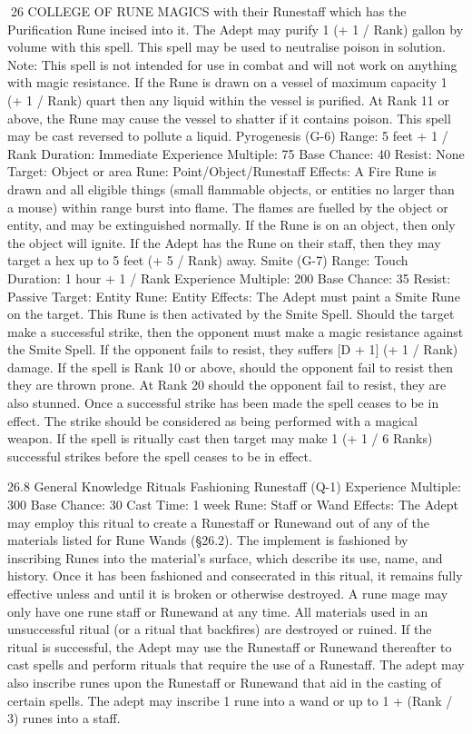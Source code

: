 \documentclass[a4paper]{article}
\begin{document}
\begin{multicols}{3}
26 COLLEGE OF RUNE MAGICS
with their Runestaff which has the Purification
Rune incised into it. The Adept may purify 1 (+ 1 /
Rank) gallon by volume with this spell. This spell
may be used to neutralise poison in solution. Note:
This spell is not intended for use in combat and
will not work on anything with magic resistance. If
the Rune is drawn on a vessel of maximum capacity 1 (+ 1 / Rank) quart then any liquid within the
vessel is purified. At Rank 11 or above, the Rune
may cause the vessel to shatter if it contains poison.
This spell may be cast reversed to pollute a liquid.
Pyrogenesis (G-6)
Range: 5 feet + 1 / Rank
Duration: Immediate
Experience Multiple: 75
Base Chance: 40%
Resist: None
Target: Object or area
Rune: Point/Object/Runestaff
Effects: A Fire Rune is drawn and all eligible
things (small flammable objects, or entities no
larger than a mouse) within range burst into flame.
The flames are fuelled by the object or entity, and
may be extinguished normally.
If the Rune is on an object, then only the object
will ignite. If the Adept has the Rune on their staff,
then they may target a hex up to 5 feet (+ 5 / Rank)
away.
Smite (G-7)
Range: Touch
Duration: 1 hour + 1 / Rank
Experience Multiple: 200
Base Chance: 35%
Resist: Passive
Target: Entity
Rune: Entity
Effects: The Adept must paint a Smite Rune on the
target. This Rune is then activated by the Smite
Spell. Should the target make a successful strike,
then the opponent must make a magic resistance
against the Smite Spell. If the opponent fails to
resist, they suffers [D + 1] (+ 1 / Rank) damage. If
the spell is Rank 10 or above, should the opponent
fail to resist then they are thrown prone. At Rank
20 should the opponent fail to resist, they are also
stunned.
Once a successful strike has been made the spell
ceases to be in effect. The strike should be considered as being performed with a magical weapon.
If the spell is ritually cast then target may make 1
(+ 1 / 6 Ranks) successful strikes before the spell
ceases to be in effect.

26.8 General Knowledge Rituals
Fashioning Runestaff (Q-1)
Experience Multiple: 300
Base Chance: 30%
Cast Time: 1 week
Rune: Staff or Wand
Effects: The Adept may employ this ritual to create
a Runestaff or Runewand out of any of the materials listed for Rune Wands (§26.2). The implement
is fashioned by inscribing Runes into the material’s
surface, which describe its use, name, and history.
Once it has been fashioned and consecrated in this
ritual, it remains fully effective unless and until it
is broken or otherwise destroyed. A rune mage
may only have one rune staff or Runewand at any
time.
All materials used in an unsuccessful ritual (or a
ritual that backfires) are destroyed or ruined. If the
ritual is successful, the Adept may use the
Runestaff or Runewand thereafter to cast spells and
perform rituals that require the use of a Runestaff.
The adept may also inscribe runes upon the
Runestaff or Runewand that aid in the casting of
certain spells. The adept may inscribe 1 rune into a
wand or up to 1 + (Rank / 3) runes into a staff.


\end{multicols}
\end{document}
